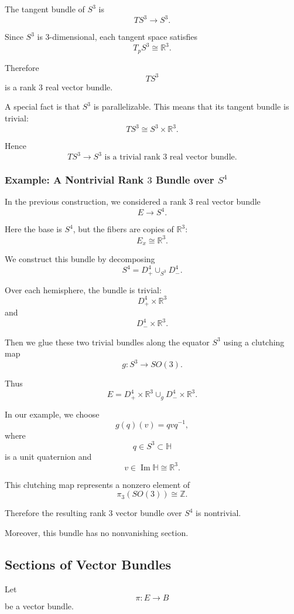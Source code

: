 \documentclass[12pt,a4paper]{article}
\theoremstyle{notespace}
\begin{document}
The tangent bundle of \(S^3\) is
\[
TS^3\longrightarrow S^3.
\]

Since \(S^3\) is \(3\)-dimensional, each tangent space satisfies
\[
T_pS^3\cong \mathbb R^3.
\]

Therefore
\[
TS^3
\]
is a rank \(3\) real vector bundle.

A special fact is that \(S^3\) is parallelizable. This means that its tangent bundle is trivial:
\[
TS^3\cong S^3\times \mathbb R^3.
\]

Hence
\[
\boxed{
	TS^3\to S^3
	\text{ is a trivial rank }3\text{ real vector bundle.}
}
\]

\subsubsection{Example: A Nontrivial Rank \(3\) Bundle over \(S^4\)}

In the previous construction, we considered a rank \(3\) real vector bundle
\[
E\longrightarrow S^4.
\]

Here the base is \(S^4\), but the fibers are copies of \(\mathbb R^3\):
\[
E_x\cong \mathbb R^3.
\]

We construct this bundle by decomposing
\[
S^4=D^4_+\cup_{S^3}D^4_-.
\]

Over each hemisphere, the bundle is trivial:
\[
D^4_+\times \mathbb R^3
\]
and
\[
D^4_-\times \mathbb R^3.
\]

Then we glue these two trivial bundles along the equator \(S^3\) using a clutching map
\[
g:S^3\to SO(3).
\]

Thus
\[
E=
D^4_+\times \mathbb R^3
\cup_g
D^4_-\times \mathbb R^3.
\]

In our example, we choose
\[
g(q)(v)=qvq^{-1},
\]
where
\[
q\in S^3\subset \mathbb H
\]
is a unit quaternion and
\[
v\in \operatorname{Im}\mathbb H\cong \mathbb R^3.
\]

This clutching map represents a nonzero element of
\[
\pi_3(SO(3))\cong \mathbb Z.
\]

Therefore the resulting rank \(3\) vector bundle over \(S^4\) is nontrivial.

Moreover, this bundle has no nonvanishing section.

\subsection{Sections of Vector Bundles}

Let
\[
\pi:E\to B
\]
be a vector bundle.
\end{document}
